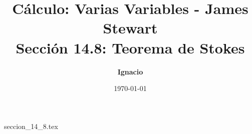\documentclass[11pt,spanish,oneside]{report}
\title{\textbf{Cálculo: Varias Variables - James Stewart} \\ \Large Sección 14.8: Teorema de Stokes}
\author{\textbf{Ignacio}}
\date{\today}
\begin{document}
\maketitle

{seccion_14_8.tex}
\end{document}
